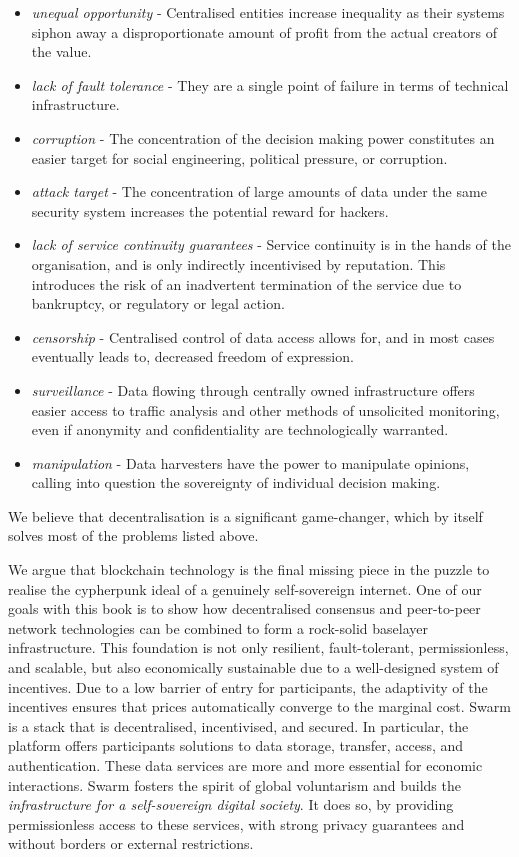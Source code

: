 \begin{itemize}
    \item \emph{unequal opportunity} - Centralised entities increase inequality as their systems siphon away a disproportionate amount of profit from the actual creators of the value.
    \item \emph{lack of fault tolerance} - They are a single point of failure in terms of technical infrastructure.
    \item \emph{corruption} - The concentration of the decision making power constitutes an easier target for social engineering, political pressure, or corruption.
    \item \emph{attack target} - The concentration of large amounts of data under the same security system increases the potential reward for hackers. 
    \item \emph{lack of service continuity guarantees} - Service continuity is in the hands of the organisation, and is only indirectly incentivised by reputation. This introduces the risk of an inadvertent termination of the service due to bankruptcy, or regulatory or legal action.
    \item \emph{censorship} - Centralised control of data access allows for, and in most cases eventually leads to, decreased freedom of expression.
    \item \emph{surveillance} - Data flowing through centrally owned infrastructure offers easier access to traffic analysis and other methods of unsolicited monitoring, even if anonymity and confidentiality are technologically warranted.
    \item \emph{manipulation} - Data harvesters have the power to manipulate opinions, calling into question the sovereignty of individual decision making.
\end{itemize}

We believe that decentralisation is a significant game-changer, which by itself solves most of the problems listed above.

We argue that blockchain technology is the final missing piece in the puzzle to realise the cypherpunk ideal of a genuinely self-sovereign internet. One of our goals with this book is to show how decentralised consensus and peer-to-peer network technologies can be combined to form a rock-solid baselayer infrastructure. This foundation is not only resilient, fault-tolerant, permissionless, and scalable, but also economically sustainable due to a well-designed system of incentives. Due to a low barrier of entry for participants, the adaptivity of the incentives ensures that prices automatically converge to the marginal cost.
Swarm is a  stack that is decentralised, incentivised, and secured. In particular, the platform offers participants solutions to data storage, transfer, access, and authentication. These data services are more and more essential for economic interactions. Swarm fosters the spirit of global voluntarism and builds the \emph{infrastructure for a self-sovereign digital society}. It does so, by providing permissionless access to these services, with strong privacy guarantees and without borders or external restrictions.

